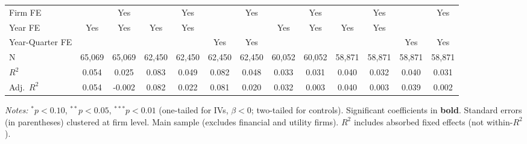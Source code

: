 \begin{landscape}
\begin{table}[H]
\begin{tabular}{lcccccccccccc}
Firm FE &  & Yes &  & Yes &  & Yes &  & Yes &  & Yes &  & Yes \\
Year FE & Yes & Yes & Yes & Yes &  &  & Yes & Yes & Yes & Yes &  &  \\
Year-Quarter FE &  &  &  &  & Yes & Yes &  &  &  &  & Yes & Yes \\
\midrule
N & 65,069 & 65,069 & 62,450 & 62,450 & 62,450 & 62,450 & 60,052 & 60,052 & 58,871 & 58,871 & 58,871 & 58,871 \\
$R^2$ & 0.054 & 0.025 & 0.083 & 0.049 & 0.082 & 0.048 & 0.033 & 0.031 & 0.040 & 0.032 & 0.040 & 0.031 \\
Adj.~$R^2$ & 0.054 & -0.002 & 0.082 & 0.022 & 0.081 & 0.020 & 0.032 & 0.003 & 0.040 & 0.003 & 0.039 & 0.002 \\
\bottomrule
\end{tabular}
\begin{minipage}{\linewidth}
\vspace{2pt}\scriptsize
\textit{Notes:} $^{*}p<0.10$, $^{**}p<0.05$, $^{***}p<0.01$ (one-tailed for IVs, $\beta < 0$; two-tailed for controls).
 Significant coefficients in \textbf{bold}.
 Standard errors (in parentheses) clustered at firm level.
 Main sample (excludes financial and utility firms).
 $R^2$ includes absorbed fixed effects (not within-$R^2$).
\end{minipage}
\end{table}
\end{landscape}